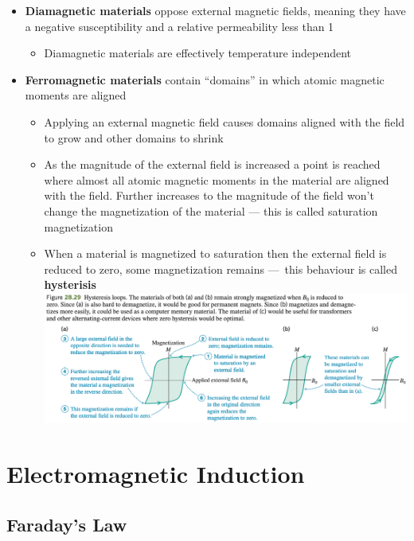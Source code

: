 \documentclass{article}
\begin{document}
\begin{itemize}
  \item \textbf{Diamagnetic materials} oppose external magnetic fields, meaning they have a negative susceptibility and a relative permeability less than 1

        \begin{itemize}
          \item Diamagnetic materials are effectively temperature independent
        \end{itemize}

  \item \textbf{Ferromagnetic materials} contain ``domains'' in which atomic magnetic moments are aligned

        \begin{itemize}
          \item Applying an external magnetic field causes domains aligned with the field to grow and other domains to shrink

          \item As the magnitude of the external field is increased a point is reached where almost all atomic magnetic moments in the material are aligned with the field. Further increases to the magnitude of the field won't change the magnetization of the material — this is called saturation magnetization

          \item When a material is magnetized to saturation then the external field is reduced to zero, some magnetization remains — this behaviour is called \textbf{hysterisis} \\ \includegraphics[scale=0.32]{hysterisis-loops}
        \end{itemize}
\end{itemize}

\section{Electromagnetic Induction}

\setcounter{subsection}{1}
\subsection{Faraday's Law}
\end{document}
